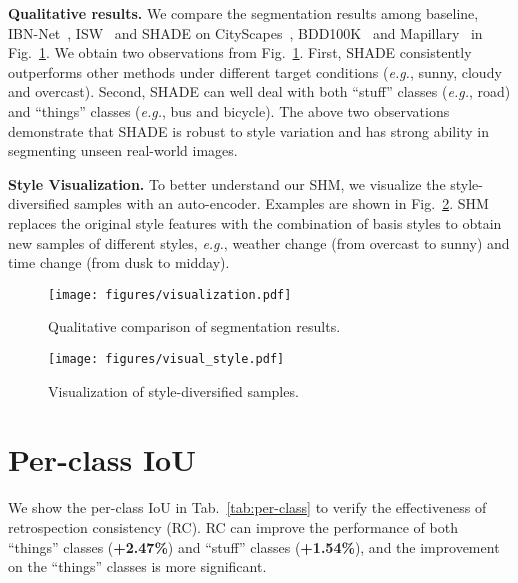 \documentclass[runningheads]{llncs}
\def\eg{\emph{e.g.}} \def\Eg{\emph{E.g.}}
\newcommand{\ours}{SHADE\xspace}
\begin{document}
\noindent\textbf{Qualitative results.} We compare the segmentation results among baseline, IBN-Net~\cite{ibn}, ISW~\cite{robustnet} and \ours on CityScapes~\cite{cityscapes}, BDD100K~\cite{bdd} and Mapillary~\cite{mapillary} in Fig.~\ref{fig:seg_results}. 
We obtain two observations from Fig.~\ref{fig:seg_results}.
First, \ours consistently outperforms other methods under different target conditions (\eg, sunny, cloudy and overcast).
Second, \ours can well deal with both ``stuff'' classes (\eg, road) and ``things'' classes (\eg, bus and bicycle).
The above two observations demonstrate that \ours is robust to style variation and has strong ability in segmenting unseen real-world images.

\noindent\textbf{Style Visualization.} To better understand our SHM, we visualize the style-diversified samples with an auto-encoder.
Examples are shown in Fig.~\ref{fig:visual_style}. SHM replaces the original style features with the combination of basis styles to obtain new samples of different styles, \eg, weather change (from overcast to sunny) and time change (from dusk to midday).

\begin{figure}[ht]
    \centering
    \texttt{[image: figures/visualization.pdf]}
    \caption{Qualitative comparison of segmentation results.}
    \label{fig:seg_results}
\end{figure}

\begin{figure}[t]
    \centering
    \texttt{[image: figures/visual\_style.pdf]}
    \caption{Visualization of style-diversified samples.}
    \label{fig:visual_style}
\end{figure}

\section{Per-class IoU}
We show the per-class IoU in Tab.~\ref{tab:per-class} to verify the effectiveness of retrospection consistency (RC). RC can improve the performance of both ``things'' classes (\textbf{+2.47\%}) and ``stuff'' classes (\textbf{+1.54\%}), and the improvement on the ``things'' classes is more significant.
\end{document}

